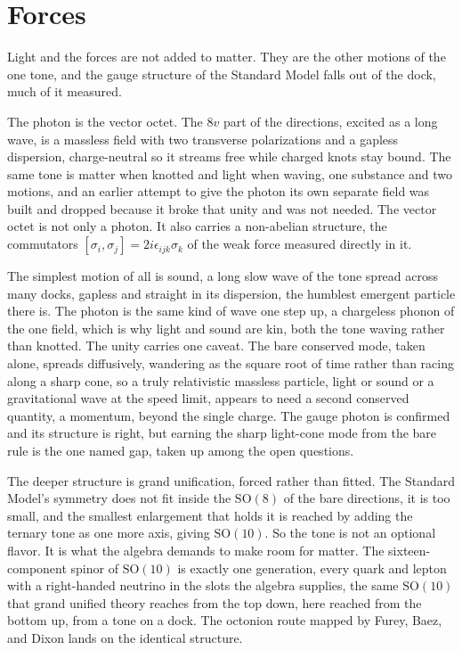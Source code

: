 \section{Forces}

Light and the forces are not added to matter. They are the other motions of the one tone, and the gauge structure of the Standard Model falls out of the dock, much of it measured. \cite{pollard2026vibetest}

The photon is the vector octet. The $8v$ part of the directions, excited as a long wave, is a massless field with two transverse polarizations and a gapless dispersion, charge-neutral so it streams free while charged knots stay bound. The same tone is matter when knotted and light when waving, one substance and two motions, and an earlier attempt to give the photon its own separate field was built and dropped because it broke that unity and was not needed. The vector octet is not only a photon. It also carries a non-abelian structure, the commutators $[\sigma_i, \sigma_j] = 2i\epsilon_{ijk}\sigma_k$ of the weak force measured directly in it.

The simplest motion of all is sound, a long slow wave of the tone spread across many docks, gapless and straight in its dispersion, the humblest emergent particle there is. The photon is the same kind of wave one step up, a chargeless phonon of the one field, which is why light and sound are kin, both the tone waving rather than knotted. The unity carries one caveat. The bare conserved mode, taken alone, spreads diffusively, wandering as the square root of time rather than racing along a sharp cone, so a truly relativistic massless particle, light or sound or a gravitational wave at the speed limit, appears to need a second conserved quantity, a momentum, beyond the single charge. The gauge photon is confirmed and its structure is right, but earning the sharp light-cone mode from the bare rule is the one named gap, taken up among the open questions.

The deeper structure is grand unification, forced rather than fitted. The Standard Model's symmetry does not fit inside the $\mathrm{SO}(8)$ of the bare directions, it is too small, and the smallest enlargement that holds it is reached by adding the ternary tone as one more axis, giving $\mathrm{SO}(10)$. So the tone is not an optional flavor. It is what the algebra demands to make room for matter. The sixteen-component spinor of $\mathrm{SO}(10)$ is exactly one generation, every quark and lepton with a right-handed neutrino in the slots the algebra supplies, the same $\mathrm{SO}(10)$ that grand unified theory reaches from the top down, here reached from the bottom up, from a tone on a dock. The octonion route mapped by Furey, Baez, and Dixon lands on the identical structure.

